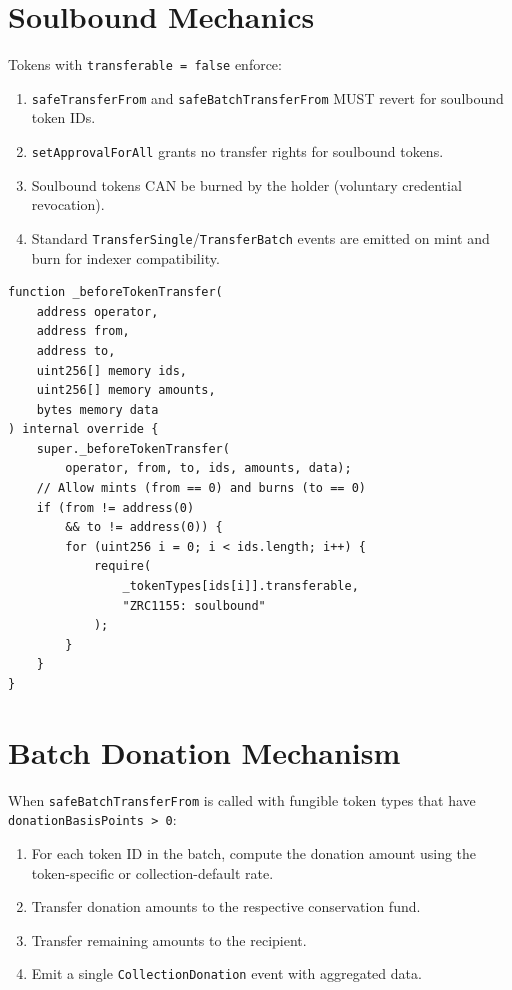 \documentclass[11pt,letterpaper]{article}
\begin{document}
\section{Soulbound Mechanics}
\label{sec:soulbound}

Tokens with \texttt{transferable = false} enforce:

\begin{enumerate}
    \item \texttt{safeTransferFrom} and \texttt{safeBatchTransferFrom} MUST revert for soulbound token IDs.
    \item \texttt{setApprovalForAll} grants no transfer rights for soulbound tokens.
    \item Soulbound tokens CAN be burned by the holder (voluntary credential revocation).
    \item Standard \texttt{TransferSingle}/\texttt{TransferBatch} events are emitted on mint and burn for indexer compatibility.
\end{enumerate}

\begin{lstlisting}[language=Solidity,caption=Soulbound enforcement in \_beforeTokenTransfer]
function _beforeTokenTransfer(
    address operator,
    address from,
    address to,
    uint256[] memory ids,
    uint256[] memory amounts,
    bytes memory data
) internal override {
    super._beforeTokenTransfer(
        operator, from, to, ids, amounts, data);
    // Allow mints (from == 0) and burns (to == 0)
    if (from != address(0)
        && to != address(0)) {
        for (uint256 i = 0; i < ids.length; i++) {
            require(
                _tokenTypes[ids[i]].transferable,
                "ZRC1155: soulbound"
            );
        }
    }
}
\end{lstlisting}

\section{Batch Donation Mechanism}
\label{sec:donation}

When \texttt{safeBatchTransferFrom} is called with fungible token types that have \texttt{donationBasisPoints > 0}:

\begin{enumerate}
    \item For each token ID in the batch, compute the donation amount using the token-specific or collection-default rate.
    \item Transfer donation amounts to the respective conservation fund.
    \item Transfer remaining amounts to the recipient.
    \item Emit a single \texttt{CollectionDonation} event with aggregated data.
\end{enumerate}
\end{document}
